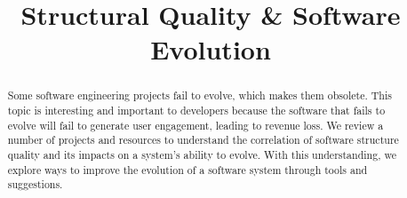 \documentclass[12pt,conference]{IEEEtran}
\begin{document}
\pagestyle{plain}

\title{Structural Quality \& Software Evolution}

\author{
}

\maketitle


\begin{abstract}

Some software engineering projects fail to evolve, which makes them obsolete.
This topic is interesting and important to developers because the software that fails to evolve will fail to generate user engagement, leading to revenue loss.
We review a number of projects and resources to understand the correlation of software structure quality and its impacts on a system's ability to evolve.
With this understanding, we explore ways to improve the evolution of a software system through tools and suggestions.

\end{abstract}


\vspace{0.5cm}
\end{document}
